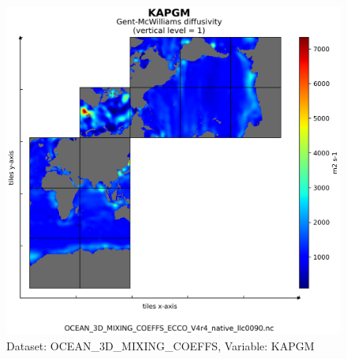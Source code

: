 \begin{figure}[H]
\centering
\includegraphics[scale=0.55]{../images/plots/v4r4/native_plots/Ocean_3D_Gent-Mcwilliams_Redi_and_Background_Vertical_Diffusivity_Coefficients_for_the_Lat-Lon-Cap_90_(llc90)_Native_Model_Grid_(Version_4_Release_4)/KAPGM.png}
\caption{Dataset: OCEAN\_3D\_MIXING\_COEFFS, Variable: KAPGM}
\label{tab:table-OCEAN_3D_MIXING_COEFFS_KAPGM-Plot}
\end{figure}
\newpage
\pagebreak

